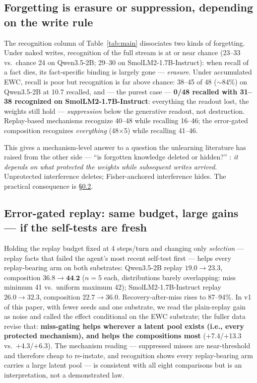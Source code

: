 \documentclass[11pt]{article}
\newcommand{\qwen}{Qwen3.5-2B}
\newcommand{\smol}{SmolLM2-1.7B-Instruct}
\begin{document}
\subsection{Forgetting is erasure or suppression, depending on the write rule}\label{sec:suppression}

The recognition column of Table~\ref{tab:main} dissociates two kinds of forgetting. Under naked
writes, recognition of the full stream is at or near chance (23--33 vs.\ chance 24 on \qwen{};
29--30 on \smol{}): when recall of a fact dies, its fact-specific binding is largely gone ---
\emph{erasure}. Under accumulated EWC, recall is poor but recognition is far above chance: 38--45 of
48 ($\sim$84\%) on \qwen{} at 10.7 recalled, and --- the purest case --- \textbf{0/48 recalled with
31--38 recognized on \smol{}}: everything the readout lost, the weights still hold ---
\emph{suppression} below the generative readout, not destruction. Replay-based mechanisms recognize
40--48 while recalling 16--46; the error-gated composition recognizes \emph{everything} (48$\times$5)
while recalling 41--46.

This gives a mechanism-level answer to a question the unlearning literature has raised from the other
side --- ``is forgotten knowledge deleted or hidden?''
\citep{unlearning-deletion,quantization-unlearning}: \emph{it depends on what protected the weights
while subsequent writes arrived}. Unprotected interference deletes; Fisher-anchored interference
hides. The practical consequence is \S\ref{sec:errorgated}.

\subsection{Error-gated replay: same budget, large gains --- if the self-tests are fresh}
\label{sec:errorgated}

Holding the replay budget fixed at 4 steps/turn and changing only \emph{selection} --- replay facts
that failed the agent's most recent self-test first --- helps every replay-bearing arm on both
substrates: \qwen{} replay $19.0\to23.3$, composition $36.8\to\textbf{44.2}$ ($n{=}5$ each,
distributions barely overlapping: miss minimum 41 vs.\ uniform maximum 42); \smol{} replay
$26.0\to32.3$, composition $22.7\to36.0$. Recovery-after-miss rises to 87--94\%. In v1 of this paper,
with fewer seeds and one substrate, we read the plain-replay gain as noise and called the effect
conditional on the EWC substrate; the fuller data revise that: \textbf{miss-gating helps wherever a
latent pool exists (i.e., every protected mechanism), and helps the compositions most} (+7.4/+13.3
vs.\ +4.3/+6.3). The mechanism reading --- suppressed misses are near-threshold and therefore cheap to
re-instate, and recognition shows every replay-bearing arm carries a large latent pool --- is
consistent with all eight comparisons but is an interpretation, not a demonstrated law.
\end{document}
